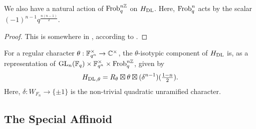 \documentclass[../main.tex]{subfiles}
\begin{document}
\begin{prop}
  We also have a natural action of $\mathrm{Frob}_q^{n\mathbb{Z}}$ on $H_\mathrm{DL}$. Here, $\mathrm{Frob}_q^n$
  acts by the scalar $(-1)^{n-1} q^{\frac{n(n-1)}2}$. 
  \begin{proof}
    This is somewhere in \cite{digne1985fonctions}, according to \cite[Lemma
    5.10]{mieda2016geometric}.
  \end{proof}
\end{prop}

\begin{thm}[]
  For a regular character $\theta: \mathbb{F}_{q^n}^\times \to \mathbb{C}^\times$, the 
  $\theta$-isotypic component of $H_\mathrm{DL}$ is, as a representation of 
  $\operatorname{GL}_n(\mathbb{F}_q) \times \mathbb{F}_{q^n}^\times \times \mathrm{Frob}_q^{n\mathbb{Z}}$, given by 
  \begin{equation*}
    {H_\mathrm{DL}}_{,\theta} = R_\theta \boxtimes \theta \boxtimes (\delta^{n-1})(\tfrac{1-n}2).
  \end{equation*}
  Here, $\delta: W_{F_n} \to \{\pm 1\}$ is the non-trivial quadratic unramified character.
\end{thm}


\subsection{The Special Affinoid} %
\label{sub:The Special Affinoid}
\begin{defi}
  \todo{}
\end{defi}

\end{document}
